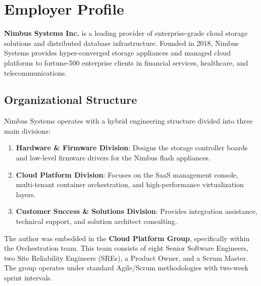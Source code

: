 \section{Employer Profile}
\label{sec:employer_profile}

\textbf{Nimbus Systems Inc.} is a leading provider of enterprise-grade cloud storage solutions and distributed database infrastructure. Founded in 2018, Nimbus Systems provides hyper-converged storage appliances and managed cloud platforms to fortune-500 enterprise clients in financial services, healthcare, and telecommunications.

\subsection{Organizational Structure}
Nimbus Systems operates with a hybrid engineering structure divided into three main divisions:
\begin{enumerate}
  \item \textbf{Hardware \& Firmware Division}: Designs the storage controller boards and low-level firmware drivers for the Nimbus flash appliances.
  \item \textbf{Cloud Platform Division}: Focuses on the SaaS management console, multi-tenant container orchestration, and high-performance virtualization layers.
  \item \textbf{Customer Success \& Solutions Division}: Provides integration assistance, technical support, and solution architect consulting.
\end{enumerate}

The author was embedded in the \textbf{Cloud Platform Group}, specifically within the Orchestration team. This team consists of eight Senior Software Engineers, two Site Reliability Engineers (SREs), a Product Owner, and a Scrum Master. The group operates under standard Agile/Scrum methodologies with two-week sprint intervals.
